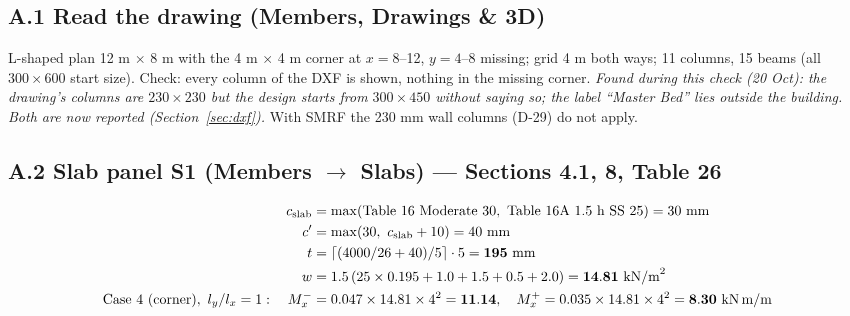 \documentclass[10pt,a4paper]{article}
\begin{document}
\subsection*{A.1 Read the drawing (Members, Drawings \& 3D)}
L-shaped plan 12 m $\times$ 8 m with the 4 m $\times$ 4 m corner at $x=8$--12, $y=4$--8 missing; grid 4 m both
ways; 11 columns, 15 beams (all $300\times600$ start size). Check: every column of the DXF is shown, nothing in the
missing corner. \emph{Found during this check (20 Oct): the drawing's columns are $230\times230$ but the design
starts from $300\times450$ without saying so; the label ``Master Bed'' lies outside the building. Both are now
reported (Section~\ref{sec:dxf}).} With SMRF the 230 mm wall columns (D-29) do not apply.

\subsection*{A.2 Slab panel S1 (Members $\rightarrow$ Slabs) --- Sections 4.1, 8, Table 26}
\begin{align*}
c_\text{slab}&=\max(\text{Table 16 Moderate }30,\ \text{Table 16A 1.5 h SS }25)=30\ \text{mm}\\
c'&=\max(30,\ c_\text{slab}+10)=40\ \text{mm}\\
t&=\lceil(4000/26+40)/5\rceil\cdot5=\mathbf{195}\ \text{mm}\\
w&=1.5\,(25\times0.195+1.0+1.5+0.5+2.0)=\mathbf{14.81}\ \text{kN/m}^2\\
\text{Case 4 (corner)},\ l_y/l_x=1:\quad M_x^-&=0.047\times14.81\times4^2=\mathbf{11.14},\quad
M_x^+=0.035\times14.81\times4^2=\mathbf{8.30}\ \text{kN\,m/m}
\end{align*}
\end{document}
